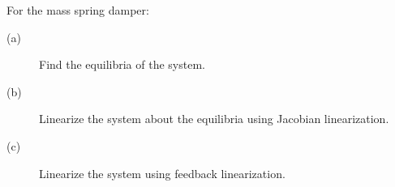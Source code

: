 For the mass spring damper:
    \begin{description}
    \item[(a)] Find the equilibria of the system.
    \item[(b)] Linearize the system about the equilibria using Jacobian linearization.
    \item[(c)] Linearize the system using feedback linearization.
    \end{description}